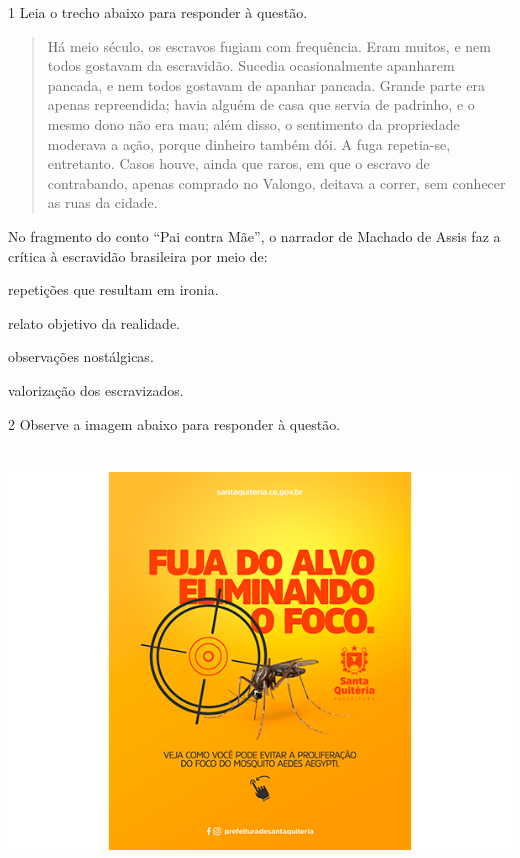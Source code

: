 
\num{1} Leia o trecho abaixo para responder à questão. 

\begin{quote}

Há meio século, os escravos fugiam com frequência. Eram muitos, e nem todos
gostavam da escravidão. Sucedia ocasionalmente apanharem pancada, e nem todos
gostavam de apanhar pancada. Grande parte era apenas repreendida; havia alguém de
casa que servia de padrinho, e o mesmo dono não era mau; além disso, o sentimento da
propriedade moderava a ação, porque dinheiro também dói. A fuga repetia-se,
entretanto. Casos houve, ainda que raros, em que o escravo de contrabando, apenas
comprado no Valongo, deitava a correr, sem conhecer as ruas da cidade.

\end{quote}


No fragmento do conto ``Pai contra Mãe'', o narrador de Machado de Assis faz a crítica
à escravidão brasileira por meio de:

\begin{escolha}

  \item repetições que resultam em ironia.
  
  \item relato objetivo da realidade.
  
  \item observações nostálgicas. 
  
  \item valorização dos escravizados. 

\end{escolha}


\num{2} Observe a imagem abaixo para responder à questão. 

\includegraphics[width=5.90551in,height=4.43056in]{./imgSAEB_7_POR/media/image6.png}

